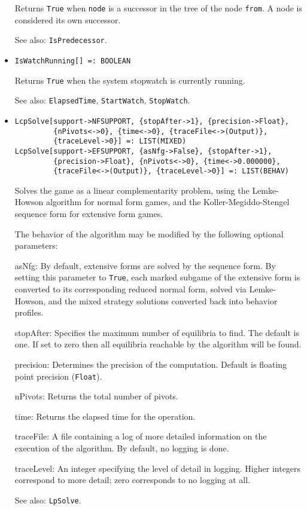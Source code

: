 \begin{itemize}
\bd
Returns \verb+True+ when \verb+node+ is a successor
in the tree of the node \verb+from+.  A node is considered its own successor.
\item [See also:] \verb+IsPredecessor+.
\ed

\item{}
\protect \large \begin{verbatim}
IsWatchRunning[] =: BOOLEAN 
\end{verbatim}\normalsize

\bd
Returns \verb+True+ when the system stopwatch is currently running.
\item
[See also:] \verb+ElapsedTime+, \verb+StartWatch+, \verb+StopWatch+.
\ed






\item{}
\protect \large \begin{verbatim}
LcpSolve[support->NFSUPPORT, {stopAfter->1}, {precision->Float}, 
         {nPivots<->0}, {time<->0}, {traceFile<->(Output)}, 
         {traceLevel->0}] =: LIST(MIXED) 
LcpSolve[support->EFSUPPORT, {asNfg->False}, {stopAfter->1}, 
         {precision->Float}, {nPivots<->0}, {time<->0.000000}, 
         {traceFile<->(Output)}, {traceLevel->0}] =: LIST(BEHAV) 
\end{verbatim}\normalsize

\bd
Solves the game as a linear complementarity problem, using the
Lemke-Howson algorithm for normal form games, and the
Koller-Megiddo-Stengel sequence form for extensive form games.  


The behavior of the algorithm may be modified by the following
optional parameters:
\bd
\item
[asNfg:] By default, extensive forms are solved by the sequence form.
By setting this parameter to \verb+True+, each marked subgame of the extensive
form is converted to its corresponding reduced normal form, solved
via Lemke-Howson, and the mixed strategy solutions converted back into
behavior profiles.
\item
[stopAfter:] Specifies the maximum number of equilibria to find.  The
default is one. If set to zero then all equilibria reachable by the
algorithm will be found.
\item
[precision:] Determines the precision of the computation. Default is
floating point precision (\verb+Float+). 
\item
[nPivots:] Returns the total number of pivots. 
\item
[time:] Returns the elapsed time for the operation.
\item
[traceFile:] A file containing a log of more detailed information on the
execution of the algorithm.  By default, no logging is done.
\item
[traceLevel:] An integer specifying the level of detail in logging.
Higher integers correspond to more detail; zero corresponds to no
logging at all.
\ed
\item [See also:] \verb+LpSolve+.
\ed


\end{itemize}
